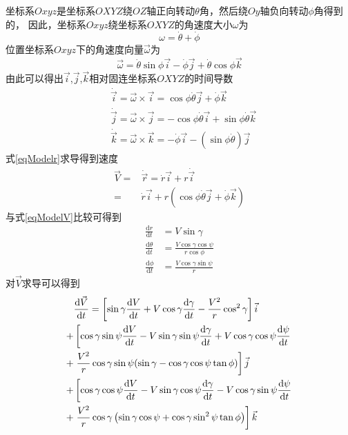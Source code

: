 坐标系$Oxyz$是坐标系$OXYZ$绕$OZ$轴正向转动$\theta$角，然后绕$Oy$轴负向转动$\phi$角得到的，
因此，坐标系$Oxyz$绕坐标系$OXYZ$的角速度大小$\omega$为
\[\omega = \dot{\theta} + \dot{\phi}\]
位置坐标系$Oxyz$下的角速度向量$\vec{\omega}$为
\[\vec{\omega} = \dot{\theta}\sin\phi\vec{i} - \dot{\phi}\vec{j} +\dot{\theta}\cos\phi\vec{k}\]
由此可以得出$\vec{i}$,$\vec{j}$,$\vec{k}$相对固连坐标系$OXYZ$的时间导数
\begin{align*}
    &\dot{\vec{i}} = \vec{\omega}\times\vec{i}
    = \cos\phi\dot{\theta}\vec{j} + \dot{\phi}\vec{k} \\
    &\dot{\vec{j}} = \vec{\omega}\times\vec{j}
    = -\cos\phi\dot{\theta}\vec{i} + \sin\phi\dot{\theta}\vec{k} \\
    &\dot{\vec{k}} = \vec{\omega}\times\vec{k}
    = -\dot{\phi}\vec{i} - (\sin\phi\dot{\theta})\vec{j}
\end{align*}
式\eqref{eqModelr}求导得到速度
\begin{align*}
    \vec{V} =& \dot{\vec{r}} = \dot{r}\vec{i} + r\dot{\vec{i}} \\
    =& \dot{r}\vec{i} + r(\cos\phi\dot{\theta}\vec{j} + \dot{\phi}\vec{k})
\end{align*}
与式\eqref{eqModelV}比较可得到
\begin{align*}
    \frac{\text{d}r}{\text{d}t} &=V\sin\gamma \\
    \frac{\text{d}\theta}{\text{d}t}&=\frac{V\cos\gamma\cos\psi}{r\cos\phi} \\
    \frac{\text{d}\phi}{\text{d}t}&=\frac{V\cos\gamma\sin\psi}{r}
\end{align*}
对$\vec{V}$求导可以得到
\begin{align*}
    &\frac{\text{d}\vec{V}}{\text{d}t}
    = \left[\sin\gamma\frac{\text{d}V}{\text{d}t}
    + V\cos\gamma\frac{\text{d}\gamma}{\text{d}t}
    - \frac{V^{2}}{r}\cos^2\gamma\right]\vec{i} \notag\\
    +& \left[\cos\gamma\sin\psi\frac{\text{d}V}{\text{d}t}
    - V\sin\gamma\sin\psi\frac{\text{d}\gamma}{\text{d}t}
    + V\cos\gamma\cos\psi\frac{\text{d}\psi}{\text{d}t}\right. \notag\\
    +& \left.\frac{V^{2}}{r}\cos\gamma\sin\psi(\sin\gamma
    - \cos\gamma\cos\psi\tan\phi)\right]\vec{j} \notag\\
    +& \left[\cos\gamma\cos\psi\frac{\text{d}V}{\text{d}t}
    - V\sin\gamma\cos\psi\frac{\text{d}\gamma}{\text{d}t}
    - V\cos\gamma\sin\psi\frac{\text{d}\psi}{\text{d}t}\right. \notag\\
    +& \left.\frac{V^{2}}{r}\cos\gamma\left(\sin\gamma\cos\psi+\cos\gamma\sin^2\psi\tan\phi\right)\right]\vec{k}
\end{align*}
